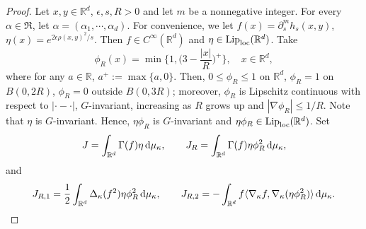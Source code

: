 \documentclass[11pt,a4paper]{article}
\def\R{\mathbb{R}}
\def\d{\textup{d}}
\def\Lip{\textup{Lip}}
\def\loc{\textup{loc}}
\theoremstyle{definition}\newtheorem{remark}[theorem]{Remark}
\begin{document}
\begin{proof}
Let $x,y\in\R^d$,  $\epsilon,s,R>0$ and let $m$ be a nonnegative integer. For every $\alpha\in\mathfrak{R}$, let $\alpha=(\alpha_1,\cdots,\alpha_d)$. For convenience, we let $f(x)=\partial_s^m h_s(x,y)$, $\eta(x)=e^{2\epsilon\rho(x,y)^2/s}$. Then $f\in C^\infty(\R^d)$ and $\eta\in \Lip_{\loc}(\R^d)$. Take
$$\phi_R(x)=\min\Big\{1,\Big(3-\frac{|x|}{R}\Big)^+\Big\},\quad x\in\R^d,$$
where for any $a\in\R$, $a^+:=\max\{a,0\}$. Then, $0\leq\phi_R\leq1$ on $\R^d$, $\phi_R=1$ on $B(0,2R)$, $\phi_R=0$ outside $B(0,3R)$; moreover, $\phi_R$ is Lipschitz continuous with respect to $|\cdot - \cdot|$, $G$-invariant, increasing as $R$ grows up and $|\nabla \phi_R|\leq 1/R$. Note that $\eta$ is $G$-invariant. Hence, $\eta\phi_R$ is $G$-invariant and $\eta\phi_R\in\Lip_{\loc}(\R^d)$.  Set
$$J=\int_{\R^d}\Gamma(f)\eta\,\d\mu_\kappa,\quad\quad J_R=\int_{\R^d}\Gamma(f)\eta\phi_R^2\,\d\mu_\kappa,$$
 and
 $$J_{R,1}=\frac{1}{2}\int_{\R^d}\Delta_\kappa(f^2)\eta\phi_R^2\,\d\mu_\kappa,\quad\quad J_{R,2}=-\int_{\R^d}f\langle\nabla_\kappa f,\nabla_\kappa(\eta\phi_R^2)\rangle\,\d\mu_\kappa.$$


\end{proof}
\end{document}
